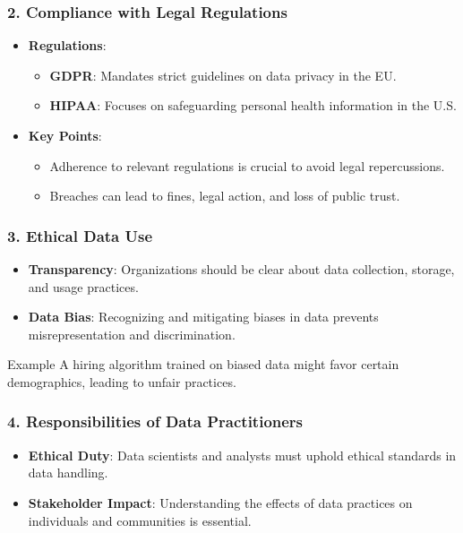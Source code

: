 \documentclass{beamer}
\begin{document}
\begin{frame}[fragile]
    \frametitle{2. Compliance with Legal Regulations}
    \begin{itemize}
        \item \textbf{Regulations}:
        \begin{itemize}
            \item \textbf{GDPR}: Mandates strict guidelines on data privacy in the EU.
            \item \textbf{HIPAA}: Focuses on safeguarding personal health information in the U.S.
        \end{itemize}
        \item \textbf{Key Points}:
        \begin{itemize}
            \item Adherence to relevant regulations is crucial to avoid legal repercussions.
            \item Breaches can lead to fines, legal action, and loss of public trust.
        \end{itemize}
    \end{itemize}
\end{frame}

\begin{frame}[fragile]
    \frametitle{3. Ethical Data Use}
    \begin{itemize}
        \item \textbf{Transparency}: Organizations should be clear about data collection, storage, and usage practices.
        \item \textbf{Data Bias}: Recognizing and mitigating biases in data prevents misrepresentation and discrimination.
    \end{itemize}
    \begin{block}{Example}
        A hiring algorithm trained on biased data might favor certain demographics, leading to unfair practices.
    \end{block}
\end{frame}

\begin{frame}[fragile]
    \frametitle{4. Responsibilities of Data Practitioners}
    \begin{itemize}
        \item \textbf{Ethical Duty}: Data scientists and analysts must uphold ethical standards in data handling.
        \item \textbf{Stakeholder Impact}: Understanding the effects of data practices on individuals and communities is essential.
    \end{itemize}
\end{frame}
\end{document}
